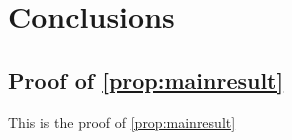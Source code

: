 \documentclass{article}
\begin{document}

\section{Conclusions}

\appendices


\begin{journalonly}

    \section{Proof of \cref{prop:mainresult}}
    \label{app:proof}

    This is the proof of \cref{prop:mainresult}
\end{journalonly}

\printmybibliography
\end{document}

